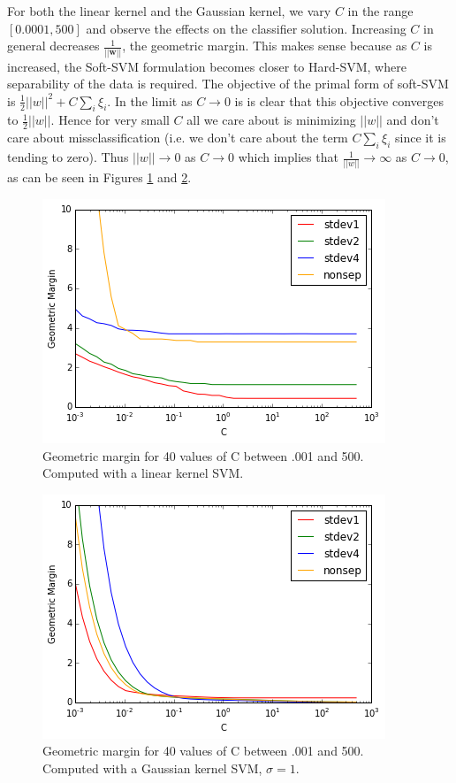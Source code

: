 \documentclass[10pt]{article}
\begin{document}
For both the linear kernel and the Gaussian kernel, we vary $C$ in the range $[0.0001, 500]$ and observe the effects on the classifier solution.  Increasing $C$ in general decreases $\frac{1}{||\mathbf{w}||}$, the geometric margin.  This makes sense because as $C$ is increased, the Soft-SVM formulation becomes closer to Hard-SVM, where separability of the data is required. The objective of the primal form of soft-SVM is $\frac{1}{2} ||w||^2 + C \sum_i \xi_i$. In the limit as $C \to 0$ is is clear that this objective converges to $\frac{1}{2}||w||$. Hence for very small $C$ all we care about is minimizing $||w||$ and don't care about missclassification (i.e. we don't care about the term $C \sum_i \xi_i$ since it is tending to zero). Thus $||w|| \to 0$ as $C \to 0$ which implies that $\frac{1}{||w||} \to \infty$ as $C \to 0$, as can be seen in Figures \ref{geom_lin} and \ref{geom_gauss}. 
\begin{figure}
\centering
\includegraphics[scale=0.5]{geom_lin.png}
\caption{Geometric margin for 40 values of C between .001 and 500.  Computed with a linear kernel SVM.}
\label{geom_lin}
\end{figure}

\begin{figure}
\centering
\includegraphics[scale=0.5]{geom_gauss.png}
\caption{Geometric margin for 40 values of C between .001 and 500.  Computed with a Gaussian kernel SVM, $\sigma=1$.}
\label{geom_gauss}
\end{figure}
\end{document}
